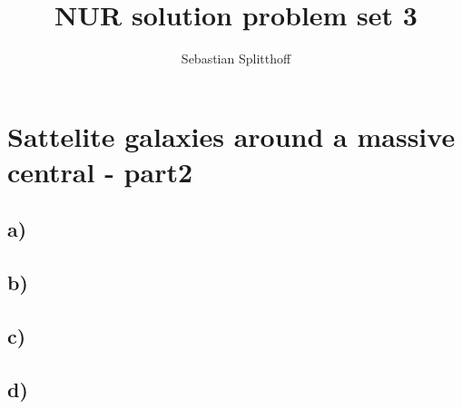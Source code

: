 \documentclass[a4paper,10pt]{article}
\title{NUR solution problem set 3}
\author{Sebastian Splitthoff}
\begin{document}
\maketitle

\section{Sattelite galaxies around a massive central - part2}
\subsection*{a)}

\subsection*{b)}

\subsection*{c)}

\subsection*{d)}

\end{document}
